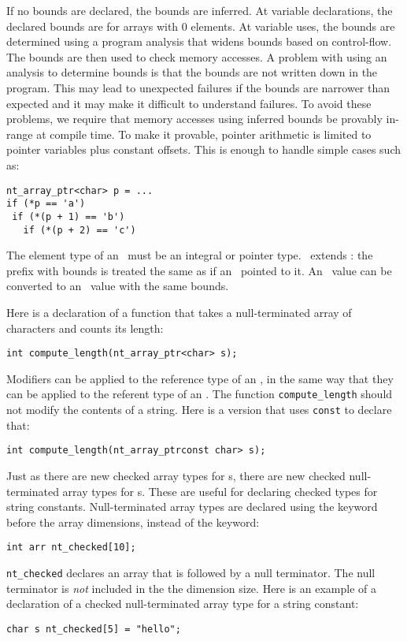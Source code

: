 If no bounds are declared, the bounds are inferred.  At variable declarations,
the declared bounds are for arrays with 0 elements.  At variable uses, 
the bounds are determined using a program analysis that widens
bounds based on control-flow.
The bounds are then used to check memory accesses.
A problem with using an analysis to determine bounds
is that the bounds are not written down in the program. 
This may lead to unexpected failures if the bounds are narrower
than expected and it may make it difficult to understand
failures.
To avoid these problems, we require that memory accesses
using inferred bounds be provably in-range at compile time.
To make it provable, pointer arithmetic is limited to
pointer variables plus constant offsets.  This is enough
to handle simple cases such as:
\begin{verbatim}
nt_array_ptr<char> p = ...
if (*p == 'a')
 if (*(p + 1) == 'b')
   if (*(p + 2) == 'c')
\end{verbatim}
   
The element type  of an \ntarrayptrT\ must be
an integral or pointer type.   \ntarrayptrT\ extends \arrayptrT: the
prefix with bounds is treated the same as if an \arrayptrT\ pointed 
to it. An \ntarrayptrT\ value can be converted to an \arrayptrT\ value
with the same bounds.

Here is a declaration of a function that takes a null-terminated
array of characters and counts its length:
\begin{verbatim}
int compute_length(nt_array_ptr<char> s);
\end{verbatim}


Modifiers can be applied to the reference type of
an \ntarrayptr, in the same way that they can be applied to the
referent type of an \arrayptr.
The function \verb+compute_length+
should not modify the contents of a string. Here
is a version that uses \verb+const+ to declare that:
\begin{verbatim}
int compute_length(nt_array_ptrconst char> s);
\end{verbatim}

Just as there are new checked array types for \arrayptr s,
there are new checked null-terminated array types for \ntarrayptr s.
These are useful for declaring  checked types for string constants.
Null-terminated array types are declared using the
 keyword before the array dimensions,
instead of the  keyword:
\begin{verbatim}
int arr nt_checked[10];
\end{verbatim}
\verb+nt_checked+ declares an array that is followed by a null
terminator.  The null terminator is {\em not} included in the
the dimension size.
Here is an example of a declaration of a checked null-terminated
array type for a string constant:
\begin{verbatim}
char s nt_checked[5] = "hello";
\end{verbatim}

